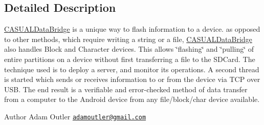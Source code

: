 \subsection{Detailed Description}
\hyperlink{class_c_a_s_u_a_l_1_1communicationstools_1_1adb_1_1busybox_1_1_c_a_s_u_a_l_data_bridge}{C\-A\-S\-U\-A\-L\-Data\-Bridge} is a unique way to flash information to a device. as opposed to other methods, which require writing a string or a file, \hyperlink{class_c_a_s_u_a_l_1_1communicationstools_1_1adb_1_1busybox_1_1_c_a_s_u_a_l_data_bridge}{C\-A\-S\-U\-A\-L\-Data\-Bridge} also handles Block and Character devices. This allows \char`\"{}flashing\char`\"{} and \char`\"{}pulling\char`\"{} of entire partitions on a device without first transferring a file to the S\-D\-Card. The technique used is to deploy a server, and monitor its operations. A second thread is started which sends or receives information to or from the device via T\-C\-P over U\-S\-B. The end result is a verifiable and error-\/checked method of data transfer from a computer to the Android device from any file/block/char device available.

\begin{DoxyAuthor}{Author}
Adam Outler \href{mailto:adamoutler@gmail.com}{\tt adamoutler@gmail.\-com} 
\end{DoxyAuthor}


